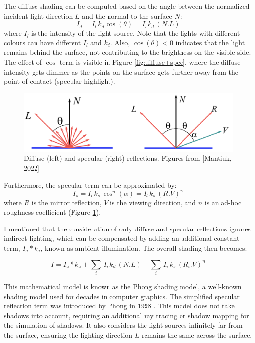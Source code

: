 The diffuse shading can be computed based on the angle between the normalized incident light direction $L$ and the normal to the surface $N$:
\begin{equation}
I_d = I_l \, k_d \cos(\theta) = I_l \, k_d \, (N . L)
\end{equation}
where $I_l$ is the intensity of the light source. Note that the lights with different colours can have different $I_l$ and $k_d$. Also, $\cos(\theta) < 0$ indicates that the light remains behind the surface, not contributing to the brightness on the visible side. The effect of $\cos$ term is visible in Figure \ref{fig:diffuse+spec}, where the diffuse intensity gets dimmer as the points on the surface gets further away from the point of contact (specular highlight). 

\begin{figure}[ht]
  \centering
   \includegraphics[width=\linewidth]{Images/diffuse+specular+angle.pdf}
   \caption{Diffuse (left) and specular (right) reflections. Figures from [Mantiuk, 2022]}
   \label{fig:diffuse-spec-angle}
\end{figure}

Furthermore, the specular term can be approximated by:
\begin{equation}
I_s = I_l \, k_s \, \cos^n(\alpha) = I_l \, k_s \, (R . V)^n 
\end{equation}
where $R$ is the mirror reflection, $V$ is the viewing direction, and $n$ is an ad-hoc roughness coefficient (Figure \ref{fig:diffuse-spec-angle}).


I mentioned that the consideration of only diffuse and specular reflections ignores indirect lighting, which can be compensated by adding an additional constant term, $I_a * k_a$, known as ambient illumination. The overall shading then becomes:

\begin{equation}
I = I_a * k_a + \sum_i \, I_i \, k_d \, (N . L) + \sum_i \, I_i \, k_s \, (R_i . V)^n
\label{eq:Phong-eq}
\end{equation}

This mathematical model is known as the Phong shading model, a well-known shading model used for decades in computer graphics. The simplified specular reflection term was introduced by Phong in 1998 \cite{phong1998illumination}. This model does not take shadows into account, requiring an additional ray tracing or shadow mapping for the simulation of shadows. It also considers the light sources infinitely far from the surface, ensuring the lighting direction $L$ remains the same across the surface.

